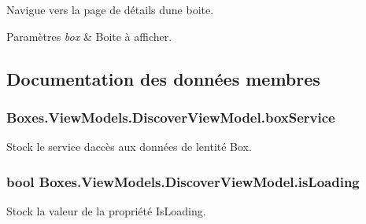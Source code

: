 Navigue vers la page de détails d\textquotesingle{}une boite. 


\begin{DoxyParams}{Paramètres}
{\em box} & Boite à afficher. \\
\hline
\end{DoxyParams}


\subsection{Documentation des données membres}
\subsubsection[{\texorpdfstring{box\+Service}{boxService}}]{ Boxes.\+View\+Models.\+Discover\+View\+Model.\+box\+Service\hspace{0.3cm}{\ttfamily [private]}}\hypertarget{class_boxes_1_1_view_models_1_1_discover_view_model_a2a376432019b9691d7186d7b836351c6}{}\label{class_boxes_1_1_view_models_1_1_discover_view_model_a2a376432019b9691d7186d7b836351c6}


Stock le service d\textquotesingle{}accès aux données de l\textquotesingle{}entité Box. 

\subsubsection[{\texorpdfstring{is\+Loading}{isLoading}}]{\setlength{\rightskip}{0pt plus 5cm}bool Boxes.\+View\+Models.\+Discover\+View\+Model.\+is\+Loading\hspace{0.3cm}{\ttfamily [private]}}\hypertarget{class_boxes_1_1_view_models_1_1_discover_view_model_a64b84ad405d9841f0b373beb851c9aed}{}\label{class_boxes_1_1_view_models_1_1_discover_view_model_a64b84ad405d9841f0b373beb851c9aed}


Stock la valeur de la propriété {\ttfamily Is\+Loading}. 

